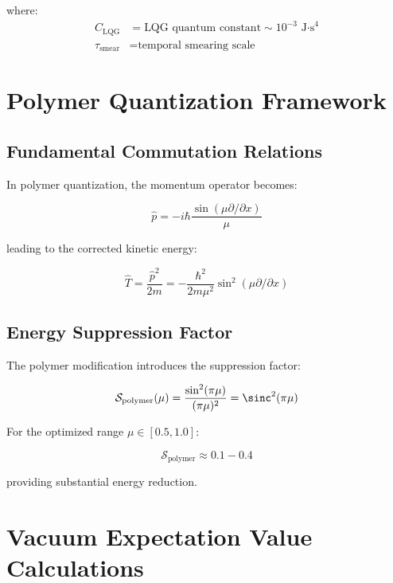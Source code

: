 \documentclass[12pt,a4paper]{article}
\begin{document}
where:
\begin{align}
C_{\text{LQG}} &= \text{LQG quantum constant} \sim 10^{-3} \text{ J·s}^4 \\
\tau_{\text{smear}} &= \text{temporal smearing scale}
\end{align}

\section{Polymer Quantization Framework}

\subsection{Fundamental Commutation Relations}

In polymer quantization, the momentum operator becomes:

\begin{equation}
\hat{p} = -i\hbar \frac{\sin(\mu \partial/\partial x)}{\mu}
\end{equation}

leading to the corrected kinetic energy:

\begin{equation}
\hat{T} = \frac{\hat{p}^2}{2m} = -\frac{\hbar^2}{2m\mu^2} \sin^2(\mu \partial/\partial x)
\end{equation}

\subsection{Energy Suppression Factor}

The polymer modification introduces the suppression factor:

\begin{equation}
\mathcal{S}_{\text{polymer}}(\mu) = \frac{\sin^2(\pi\mu)}{(\pi\mu)^2} = \sinc^2(\pi\mu)
\end{equation}

For the optimized range $\mu \in [0.5, 1.0]$:

\begin{equation}
\mathcal{S}_{\text{polymer}} \approx 0.1 - 0.4
\end{equation}

providing substantial energy reduction.

\section{Vacuum Expectation Value Calculations}
\end{document}
